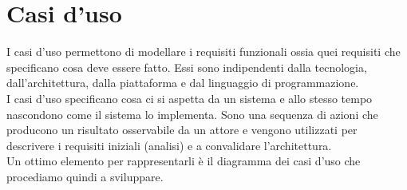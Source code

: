 \documentclass[a4paper, 11pt,oneside]{book}
\begin{document}
\chapter{Casi d'uso}
    I casi d'uso permettono di modellare i requisiti funzionali ossia quei requisiti che specificano cosa deve essere fatto. Essi sono indipendenti dalla tecnologia,
    dall'architettura, dalla piattaforma e dal linguaggio di programmazione.\\
    I casi d'uso specificano cosa ci si aspetta da un sistema e allo stesso tempo nascondono come il sistema lo implementa. Sono una sequenza di azioni che producono un risultato osservabile da un attore e vengono utilizzati
    per descrivere i requisiti iniziali (analisi) e a convalidare l'architettura.\\
    Un ottimo elemento per rappresentarli è il diagramma dei casi d'uso che procediamo quindi a sviluppare.
\end{document}
